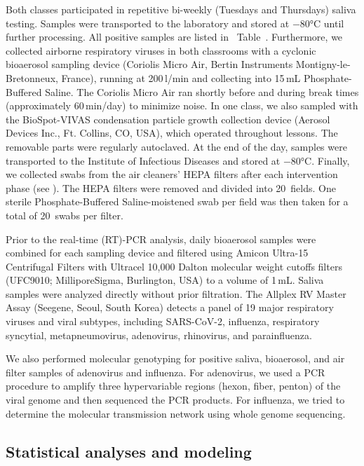 \documentclass[fleqn,11pt]{wlscirep}
\begin{document}
\noindent Both classes participated in repetitive bi-weekly (Tuesdays and Thursdays) saliva testing. Samples were transported to the laboratory and stored at $-$80°C until further processing\cite{Huber2021}. All positive samples are listed in \supp~Table~. Furthermore, we collected airborne respiratory viruses in both classrooms with a cyclonic bioaerosol sampling device (Coriolis Micro Air, Bertin Instruments Montigny-le-Bretonneux, France), running at 200\,l/min and collecting into 15\,mL Phosphate-Buffered Saline. The Coriolis Micro Air ran shortly before and during break times (approximately 60\,min/day) to minimize noise. In one class, we also sampled with the BioSpot-VIVAS condensation particle growth collection device (Aerosol Devices Inc., Ft. Collins, CO, USA)\cite{Lednicky2016AST}, which operated throughout lessons. The removable parts were regularly autoclaved. At the end of the day, samples were transported to the Institute of Infectious Diseases and stored at $-$80°C. Finally, we collected swabs from the air cleaners' HEPA filters after each intervention phase (see ). The HEPA filters were removed and divided into 20~fields. One sterile Phosphate-Buffered Saline-moistened swab per field was then taken for a total of 20~swabs per filter. 

Prior to the real-time (RT)-PCR analysis, daily bioaerosol samples were combined for each sampling device and filtered using Amicon Ultra-15 Centrifugal Filters with Ultracel 10,000 Dalton molecular weight cutoffs filters (UFC9010; MilliporeSigma, Burlington, USA) to a volume of 1\,mL. Saliva samples were analyzed directly without prior filtration. The Allplex RV Master Assay (Seegene, Seoul, South Korea) detects a panel of 19 major respiratory viruses and viral subtypes, including SARS-CoV-2, influenza, respiratory syncytial, metapneumovirus, adenovirus, rhinovirus, and parainfluenza. 

We also performed molecular genotyping for positive saliva, bioaerosol, and air filter samples of adenovirus and influenza\cite{Kelly2022FrontiersImmuno}. For adenovirus, we used a PCR procedure to amplify three hypervariable regions (hexon, fiber, penton) of the viral genome and then sequenced the PCR products\cite{Akello2021SciRep}. For influenza, we tried to determine the molecular transmission network using whole genome sequencing.

\subsection*{Statistical analyses and modeling}
\end{document}
